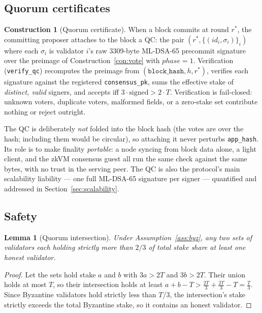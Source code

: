 \documentclass[11pt]{article}
\newcommand{\code}[1]{\texttt{#1}}
\newcommand{\mldsa}{ML\mbox{-}DSA\mbox{-}65}
\theoremstyle{plain}
\newtheorem{lemma}[theorem]{Lemma}
\theoremstyle{definition}
\newtheorem{construction}[theorem]{Construction}
\theoremstyle{remark}
\begin{document}
\subsection{Quorum certificates}
\label{sec:qc}

\begin{construction}[Quorum certificate]
\label{con:qc}
When a block commits at round $r^\ast$, the committing proposer attaches to
the block a QC: the pair $(r^\ast, \{(\mathit{id}_i, \sigma_i)\}_i)$ where
each $\sigma_i$ is validator $i$'s raw 3309-byte \mldsa{} precommit signature
over the preimage of Construction~\ref{con:vote} with
$\mathit{phase} = 1$. Verification (\code{verify\_qc}) recomputes the
preimage from $(\code{block\_hash}, h, r^\ast)$, verifies each signature
against the registered \code{consensus\_pk}, sums the effective stake of
\emph{distinct, valid} signers, and accepts iff
$3\cdot\mathrm{signed} > 2\cdot T$. Verification is fail-closed: unknown
voters, duplicate voters, malformed fields, or a zero-stake set contribute
nothing or reject outright.
\end{construction}

The QC is deliberately \emph{not} folded into the block hash (the votes are
over the hash; including them would be circular), so attaching it never
perturbs \code{app\_hash}. Its role is to make finality \emph{portable}: a
node syncing from block data alone, a light client, and the zkVM consensus
guest all run the same check against the same bytes, with no trust in the
serving peer. The QC is also the protocol's main scalability liability ---
one full \mldsa{} signature per signer --- quantified and addressed in
Section~\ref{sec:scalability}.

\subsection{Safety}
\label{sec:safety}

\begin{lemma}[Quorum intersection]
\label{lem:intersect}
Under Assumption~\ref{ass:byz}, any two sets of validators each holding
strictly more than $2/3$ of total stake share at least one honest validator.
\end{lemma}

\begin{proof}
Let the sets hold stake $a$ and $b$ with $3a > 2T$ and $3b > 2T$. Their
union holds at most $T$, so their intersection holds at least
$a + b - T > \tfrac{2T}{3} + \tfrac{2T}{3} - T = \tfrac{T}{3}$. Since
Byzantine validators hold strictly less than $T/3$, the intersection's stake
strictly exceeds the total Byzantine stake, so it contains an honest
validator.
\end{proof}
\end{document}
